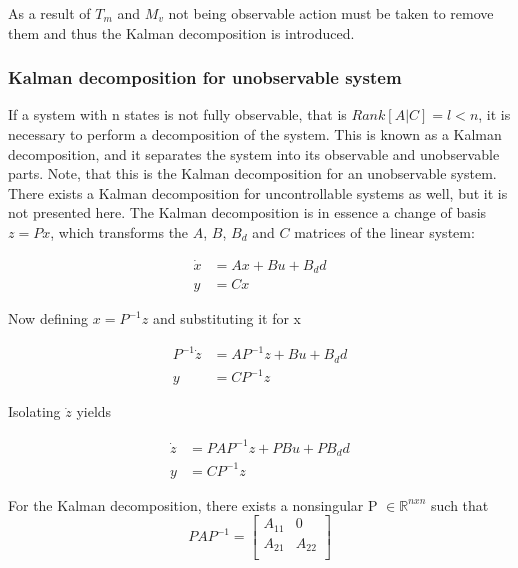 As a result of $T_m$ and $M_v$ not being observable action must be taken to remove them and thus the Kalman decomposition is introduced.

\subsubsection{Kalman decomposition for unobservable system} \label{sec:kalman}
If a system with n states is not fully observable, that is $Rank[A|C] = l < n$, it is necessary to perform a decomposition of the system. This is known as a Kalman decomposition, and it separates the system into its observable and unobservable parts. Note, that this is the Kalman decomposition for an unobservable system. There exists a Kalman decomposition for uncontrollable systems as well, but it is not presented here. The Kalman decomposition is in essence a change of basis $z=Px$, which transforms the $A$, $B$, $B_d$ and $C$ matrices of the linear system:

\begin{equation}
	\begin{split}
		\dot{x} & = Ax + Bu + B_dd \\
		y & = Cx
	\end{split}
\end{equation}

Now defining $x = P^{-1}z$ and substituting it for x

\begin{equation}
	\begin{split}
		P^{-1}\dot{z} & = AP^{-1}z + Bu + B_dd \\
		y & = CP^{-1}z
	\end{split}
\end{equation}

Isolating $\dot{z}$ yields

\begin{equation}
	\begin{split}
		\dot{z} & = PAP^{-1}z + PBu + PB_dd \\
		y & = CP^{-1}z
	\end{split}
\end{equation}

For the Kalman decomposition, there exists a nonsingular P  $\in \mathbb{R} ^{n x n}$ such that
\begin{equation}
	PAP^{-1} = \begin{bmatrix}
		A_{11}       & 0 \\
		A_{21}       & A_{22} \\
	\end{bmatrix}
\end{equation}

